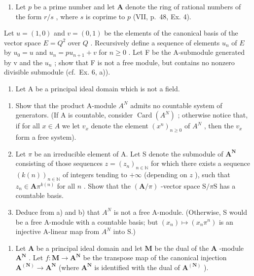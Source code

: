 \begin{enumerate}
\def\labelenumi{\arabic{enumi})}
\setcounter{enumi}{6}
\tightlist
\item
  Let \(p\) be a prime number and let \(\mathbf{A}\) denote the ring of rational numbers of the form \(r / s\) , where \(s\) is coprime to \(p\) (VII, p.~48, Ex. 4).
\end{enumerate}

Let \(u = (1,0)\) and \(v = (0,1)\) be the elements of the canonical basis of the vector space \(E = Q^2\) over \(Q\) . Recursively define a sequence of elements \(u_n\) of \(E\) by \(u_0 = u\) and \(u_{n}=pu_{n+1}+v\) for \(n\geqslant0\) . Let F be the A-submodule generated by v and the \(u_{n}\) ; show that F is not a free module, but contains no nonzero divisible submodule (cf.~Ex. 6, a)).

\begin{enumerate}
\def\labelenumi{\arabic{enumi})}
\setcounter{enumi}{7}
\tightlist
\item
  Let A be a principal ideal domain which is not a field.
\end{enumerate}

\begin{enumerate}
\def\labelenumi{\alph{enumi})}
\item
  Show that the product A-module \(A^{N}\) admits no countable system of generators. (If A is countable, consider \(\operatorname{Card}(A^{N})\) ; otherwise notice that, if for all \(x \in A\) we let \(v_{x}\) denote the element \((x^{n})_{n \geq 0}\) of \(A^{N}\) , then the \(v_{x}\) form a free system).
\item
  Let \(\pi\) be an irreducible element of A. Let S denote the submodule of \(\mathbf{A}^{\mathbf{N}}\) consisting of those sequences \(z = (z_{n})_{n\in \mathbb{N}}\) for which there exists a sequence \((k(n))_{n\in \mathbb{N}}\) of integers tending to \(+\infty\) (depending on \(z\) ), such that \(z_{n}\in \mathbf{A}\pi^{k(n)}\) for all \(n\) . Show that the \((\mathbf{A} / \pi)\) -vector space \(\mathrm{S} / \pi \mathrm{S}\) has a countable basis.
\item
  Deduce from a) and b) that \(A^{N}\) is not a free A-module. (Otherwise, S would be a free A-module with a countable basis; but \((x_{n})\mapsto(x_{n}\pi^{n})\) is an injective A-linear map from \(A^{N}\) into S.)
\end{enumerate}

\begin{enumerate}
\def\labelenumi{\arabic{enumi})}
\setcounter{enumi}{8}
\tightlist
\item
  Let \(\mathbf{A}\) be a principal ideal domain and let \(\mathbf{M}\) be the dual of the \(\mathbf{A}\) -module \(\mathbf{A}^{\mathbf{N}}\) . Let \(f: \mathbf{M} \to \mathbf{A}^{\mathbf{N}}\) be the transpose map of the canonical injection \(\mathbf{A}^{(\mathbf{N})} \to \mathbf{A}^{\mathbf{N}}\) (where \(\mathbf{A}^{\mathbf{N}}\) is identified with the dual of \(\mathbf{A}^{(\mathbf{N})}\) ).
\end{enumerate}

